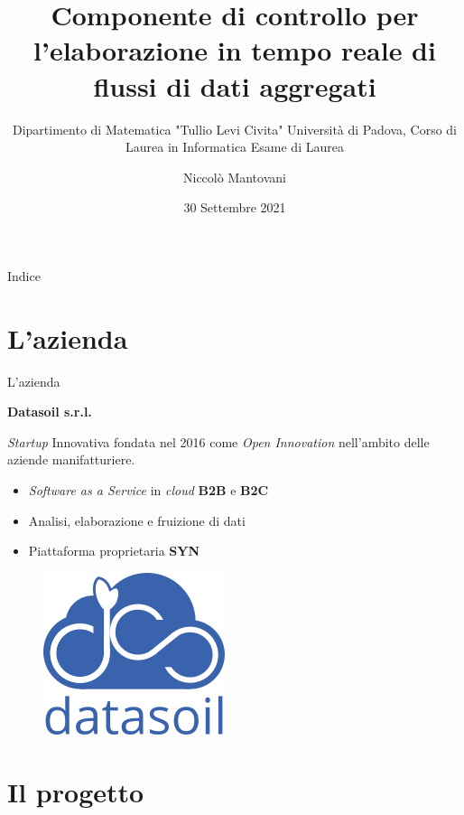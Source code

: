 \documentclass{beamer}
\title{Componente di controllo per l'elaborazione in tempo reale di flussi di dati aggregati}
\subtitle{Dipartimento di Matematica "Tullio Levi Civita" Università di Padova, Corso di Laurea in Informatica Esame di Laurea}
\date{30 Settembre 2021}
\author{Niccolò Mantovani}
\begin{document}
	\maketitle

	\begin{frame}{Indice}
		\tableofcontents
	\end{frame}


	\section{L'azienda}

	\begin{frame}{L'azienda}

		\textbf{Datasoil s.r.l.} \vspace{.2em}
		
		\textit{Startup} Innovativa fondata nel 2016 come \textit{Open Innovation} nell'ambito delle aziende manifatturiere. \vspace{.2em}
		
		\begin{itemize}
			\item \textit{Software as a Service} in \textit{cloud} \textbf{B2B} e \textbf{B2C} \vspace{.5em}
			\item Analisi, elaborazione e fruizione di dati \vspace{.5em}
			\item Piattaforma proprietaria \textbf{SYN}
		\end{itemize}
		
		\begin{figure}[!h] 
    		\centering 
    		\includegraphics[width=0.2\columnwidth]{../immagini/ds_logo.png}
		\end{figure}

	\end{frame}

	\section{Il progetto}
\end{document}
